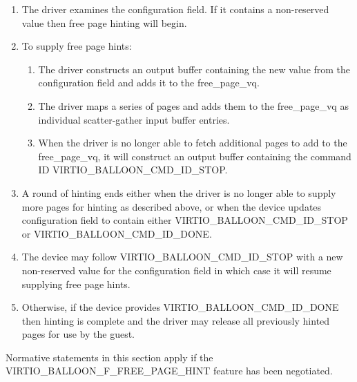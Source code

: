 \begin{enumerate}

\item The driver examines the  configuration field.
  If it contains a non-reserved value then free page hinting will begin.

\item To supply free page hints:
  \begin{enumerate}
  \item The driver constructs an output buffer containing the new value from
    the  configuration field and adds it to the
    free_page_vq.
  \item The driver maps a series of pages and adds them to the
    free_page_vq as individual scatter-gather input buffer entries.
  \item When the driver is no longer able to fetch additional pages to add
    to the free_page_vq, it will construct an output buffer containing the
    command ID VIRTIO_BALLOON_CMD_ID_STOP.
  \end{enumerate}

\item A round of hinting ends either when the driver is no longer able to
  supply more pages for hinting as described above, or when the device
  updates  configuration field to contain either
  VIRTIO_BALLOON_CMD_ID_STOP or VIRTIO_BALLOON_CMD_ID_DONE.

\item The device may follow VIRTIO_BALLOON_CMD_ID_STOP with a new
  non-reserved value for the  configuration
  field in which case it will resume supplying free page hints.

\item Otherwise, if the device provides VIRTIO_BALLOON_CMD_ID_DONE then
  hinting is complete and the driver may release all previously hinted
  pages for use by the guest.

\end{enumerate}


Normative statements in this section apply if the
VIRTIO_BALLOON_F_FREE_PAGE_HINT feature has been negotiated.

